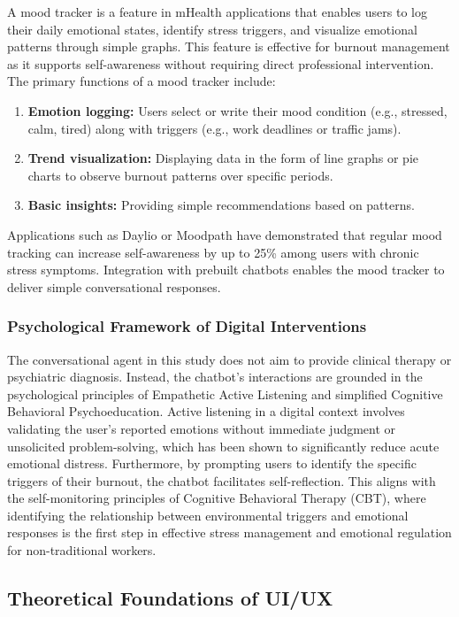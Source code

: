 A mood tracker is a feature in mHealth applications that enables users to log their daily emotional states, identify stress triggers, and visualize emotional patterns through simple graphs. This feature is effective for burnout management as it supports self-awareness without requiring direct professional intervention. The primary functions of a mood tracker include:

\begin{enumerate}
	\item \textbf{Emotion logging:} Users select or write their mood condition (e.g., stressed, calm, tired) along with triggers (e.g., work deadlines or traffic jams).
	\item \textbf{Trend visualization:} Displaying data in the form of line graphs or pie charts to observe burnout patterns over specific periods.
	\item \textbf{Basic insights:} Providing simple recommendations based on patterns.
\end{enumerate}

Applications such as Daylio or Moodpath have demonstrated that regular mood tracking can increase self-awareness by up to 25\% among users with chronic stress symptoms. Integration with prebuilt chatbots enables the mood tracker to deliver simple conversational responses.

\subsubsection{Psychological Framework of Digital Interventions}

The conversational agent in this study does not aim to provide clinical therapy or psychiatric diagnosis. Instead, the chatbot's interactions are grounded in the psychological principles of Empathetic Active Listening and simplified Cognitive Behavioral Psychoeducation. Active listening in a digital context involves validating the user's reported emotions without immediate judgment or unsolicited problem-solving, which has been shown to significantly reduce acute emotional distress. Furthermore, by prompting users to identify the specific triggers of their burnout, the chatbot facilitates self-reflection. This aligns with the self-monitoring principles of Cognitive Behavioral Therapy (CBT), where identifying the relationship between environmental triggers and emotional responses is the first step in effective stress management and emotional regulation for non-traditional workers.

\subsection{Theoretical Foundations of UI/UX}

